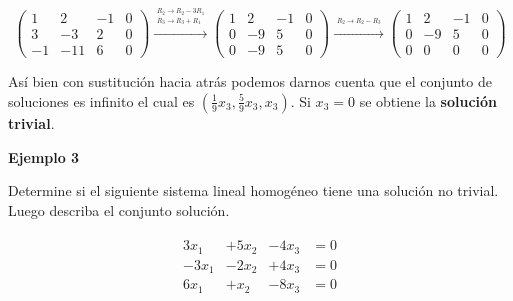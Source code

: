 \documentclass{article}
\begin{document}
\begin{equation*}
    \left(\begin{array}{rrr|r}
        1 & 2 & -1 & 0 \\
        3 & -3 & 2 & 0 \\
        -1 & -11 & 6 & 0
    \end{array}\right) 
    \xrightarrow{\overset{\begin{aligned} R_2 \rightarrow R_2 - 3R_1 \\ R_3 \rightarrow R_3 + R_1\end{aligned}}{}} 
    \left(\begin{array}{rrr|r}
        1 & 2 & -1 & 0 \\
        0 & -9 & 5 & 0 \\
        0 & -9 & 5 & 0
    \end{array}\right)
    \xrightarrow{\overset{\begin{aligned} R_2 \rightarrow R_2 -R_3\end{aligned}}{}} 
    \left(\begin{array}{rrr|r}
        1 & 2 & -1 & 0 \\
        0 & -9 & 5 & 0 \\
        0 & 0 & 0 & 0
    \end{array}\right)
\end{equation*}

Así bien con sustitución hacia atrás podemos darnos cuenta que el conjunto de soluciones es infinito el cual es $(\frac{1}{9} x_3, \frac{5}{9} x_3, x_3)$. Si $x_3 = 0$ se obtiene la \textbf{solución trivial}.

\begin{large}
    \textbf{Ejemplo 3}
\end{large}

Determine si el siguiente sistema lineal homogéneo tiene una solución no trivial. Luego describa el conjunto solución.

\begin{equation*}
    \begin{matrix}
        \begin{aligned}
            3x_1 &+ 5x_2 &- 4x_3 & =0\\
            -3x_1 &- 2x_2 &+ 4x_3 & =0\\
            6x_1 &+ x_2 &- 8x_3 & =0
        \end{aligned}
    \end{matrix}
\end{equation*}
\end{document}

